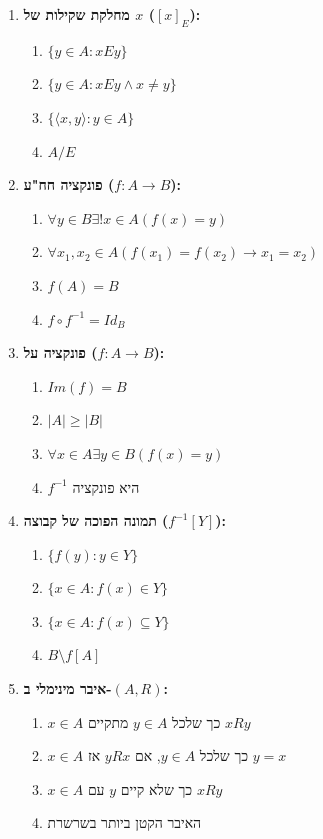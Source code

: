 \documentclass[a4paper,11pt]{article}
\begin{document}
\begin{enumerate}
    \item \textbf{מחלקת שקילות של \(x\) (\([x]_E\)):}
          \begin{enumerate}
              \item \(\{y \in A : xEy\}\)
              \item \(\{y \in A : xEy \land x \neq y\}\)
              \item \(\{ \langle x,y \rangle : y \in A \}\)
              \item \(A / E\)
          \end{enumerate}

    \item \textbf{פונקציה חח"ע (\(f: A \to B\)):}
          \begin{enumerate}
              \item \(\forall y \in B \exists! x \in A (f(x)=y)\)
              \item \(\forall x_1, x_2 \in A (f(x_1) = f(x_2) \to x_1 = x_2)\)
              \item \(f(A) = B\)
              \item \(f \circ f^{-1} = Id_B\)
          \end{enumerate}

    \item \textbf{פונקציה על (\(f: A \to B\)):}
          \begin{enumerate}
              \item \(Im(f) = B\)
              \item \(|A| \ge |B|\)
              \item \(\forall x \in A \exists y \in B (f(x)=y)\)
              \item \(f^{-1}\) היא פונקציה
          \end{enumerate}

    \item \textbf{תמונה הפוכה של קבוצה (\(f^{-1}[Y]\)):}
          \begin{enumerate}
              \item \(\{f(y) : y \in Y\}\)
              \item \(\{x \in A : f(x) \in Y\}\)
              \item \(\{x \in A : f(x) \subseteq Y\}\)
              \item \(B \setminus f[A]\)
          \end{enumerate}

    \item \textbf{איבר מינימלי ב-\((A, R)\):}
          \begin{enumerate}
              \item \(x \in A\) כך שלכל \(y \in A\) מתקיים \(xRy\)
              \item \(x \in A\) כך שלכל \(y \in A\), אם \(yRx\) אז \(y=x\)
              \item \(x \in A\) כך שלא קיים \(y\) עם \(xRy\)
              \item האיבר הקטן ביותר בשרשרת
          \end{enumerate}


\end{enumerate}
\end{document}
